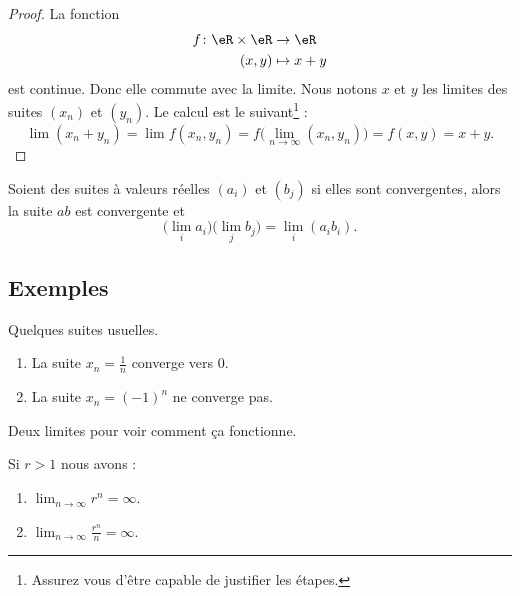 \begin{proof}
    La fonction 
    \begin{equation}
        \begin{aligned}
            f\colon \eR\times \eR&\to \eR \\
            (x,y)&\mapsto x+y 
        \end{aligned}
    \end{equation}
    est continue. Donc elle commute avec la limite. Nous notons \( x\) et \( y\) les limites des suites \( (x_n)\) et \( (y_n)\). Le calcul est le suivant\footnote{Assurez vous d'être capable de justifier les étapes.} :
    \begin{equation}
        \lim (x_n+y_n)=\lim f(x_n,y_n)=f\big( \lim_{n\to \infty} (x_n,y_n) \big)=f(x,y)=x+y.
    \end{equation}
\end{proof}

\begin{proposition}     \label{PROPooIQOAooJPMoDD}
    Soient des suites à valeurs réelles \( (a_i)\) et \( (b_j)\) si elles sont convergentes, alors la suite \( ab\) est convergente et
    \begin{equation}
        \big( \lim_ia_i \big)\big( \lim_jb_j \big)=\lim_i(a_ib_i).
    \end{equation}
\end{proposition}
 
\subsection{Exemples}

\begin{example}
	Quelques suites usuelles.
	\begin{enumerate}
		\item
			La suite $x_n=\frac{1}{ n }$ converge vers $0$.
		\item
			La suite $x_n=(-1)^n$ ne converge pas.
	\end{enumerate}
\end{example}

Deux limites pour voir comment ça fonctionne.
\begin{lemma}
    Si \( r>1\) nous avons :
    \begin{enumerate}
        \item
            \( \lim_{n\to \infty} r^n=\infty\).
        \item
            \( \lim_{n\to \infty} \frac{ r^n }{ n }=\infty\).
    \end{enumerate}
\end{lemma}

